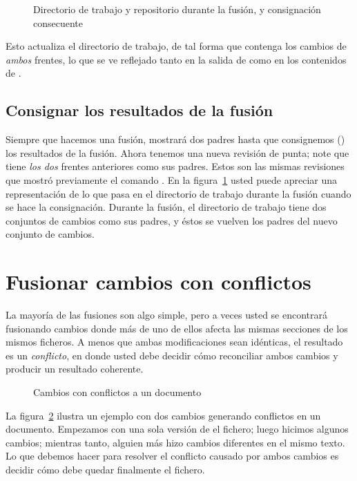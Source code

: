 \begin{figure}[ht]
  \centering
  \caption{Directorio de trabajo y repositorio durante la fusión, y
  consignación consecuente}
  \label{fig:tour-merge:merge}
\end{figure}

Esto actualiza el directorio de trabajo, de tal forma que contenga los
cambios de \emph{ambos} frentes, lo que se ve reflejado tanto en la
salida de  como en los contenidos de .

\subsection{Consignar los resultados de la fusión}

Siempre que hacemos una fusión,  mostrará dos padres
hasta que consignemos () los resultados de la fusión.
Ahora tenemos una nueva revisión de punta; note que tiene \emph{los
dos} frentes anteriores como sus padres. Estos son las mismas
revisiones que mostró previamente el comando .
En la figura~\ref{fig:tour-merge:merge} usted puede apreciar una
representación de lo que pasa en el directorio de trabajo durante la
fusión cuando se hace la consignación. Durante la fusión, el
directorio de trabajo tiene dos conjuntos de cambios como sus padres,
y éstos se vuelven los padres del nuevo conjunto de cambios.

\section{Fusionar cambios con conflictos}

La mayoría de las fusiones son algo simple, pero a veces usted se
encontrará fusionando cambios donde más de uno de ellos afecta las
mismas secciones de los mismos ficheros. A menos que ambas
modificaciones sean idénticas, el resultado es un \emph{conflicto}, en
donde usted debe decidir cómo reconciliar ambos cambios y producir un
resultado coherente.

\begin{figure}[ht]
  \centering
  \caption{Cambios con conflictos a un documento}
  \label{fig:tour-merge:conflict}
\end{figure}

La figura~\ref{fig:tour-merge:conflict} ilustra un ejemplo con dos
cambios generando conflictos en un documento. Empezamos con una sola
versión de el fichero; luego hicimos algunos cambios; mientras tanto,
alguien más  hizo cambios diferentes en el mismo texto. Lo que debemos
hacer para resolver el conflicto causado por ambos cambios es decidir
cómo debe quedar finalmente el fichero.

